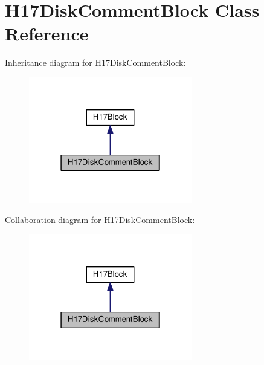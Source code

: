 \hypertarget{classH17DiskCommentBlock}{}\section{H17\+Disk\+Comment\+Block Class Reference}
\label{classH17DiskCommentBlock}


Inheritance diagram for H17\+Disk\+Comment\+Block\+:\nopagebreak
\begin{figure}[H]
\begin{center}
\leavevmode
\includegraphics[width=202pt]{classH17DiskCommentBlock__inherit__graph}
\end{center}
\end{figure}


Collaboration diagram for H17\+Disk\+Comment\+Block\+:\nopagebreak
\begin{figure}[H]
\begin{center}
\leavevmode
\includegraphics[width=202pt]{classH17DiskCommentBlock__coll__graph}
\end{center}
\end{figure}
